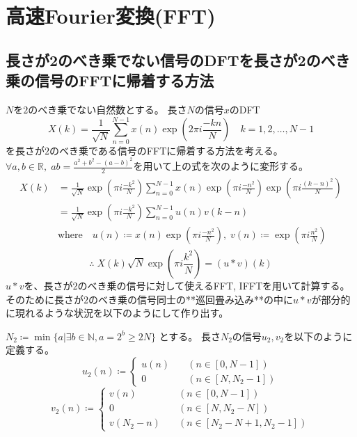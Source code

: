 \chapter{高速Fourier変換(FFT)}
    \section{長さが2のべき乗でない信号のDFTを長さが2のべき乗の信号のFFTに帰着する方法}
        $N$を$2$のべき乗でない自然数とする。
        長さ$N$の信号$x$のDFT
        \[ X(k) = \frac{1}{\sqrt{N}} \sum_{n=0}^{N-1} x(n)\exp \left(2\pi i\frac{-kn}{N}\right) \quad k=1,2,\dots,N-1 \]
        を長さが$2$のべき乗である信号のFFTに帰着する方法を考える。
        $\forall a,b\in\mathbb{R},\;ab = \frac{a^2 + b^2 - (a-b)^2}{2}$を用いて上の式を次のように変形する。
        \begin{align*}
            \begin{aligned}
                X(k) &= \frac{1}{\sqrt{N}} \exp \left(\pi i\frac{-k^2}{N}\right) \sum_{n=0}^{N-1} x(n)\exp \left(\pi i\frac{-n^2}{N}\right) \exp \left(\pi i\frac{(k-n)^2}{N}\right) \\
                &= \frac{1}{\sqrt{N}} \exp \left(\pi i\frac{-k^2}{N}\right) \sum_{n=0}^{N-1} u(n)v(k-n) \\
                & \text{where} \quad u(n) \coloneq x(n)\exp \left(\pi i\frac{-n^2}{N}\right),\;v(n) \coloneq \exp \left(\pi i\frac{n^2}{N}\right)
            \end{aligned}
        \end{align*}
        \[ \therefore\; X(k)\sqrt{N} \exp \left(\pi i\frac{k^2}{N}\right) = (u*v)(k) \]
        $u*v$を、長さが$2$のべき乗の信号に対して使えるFFT, IFFTを用いて計算する。
        そのために長さが$2$のべき乗の信号同士の**巡回畳み込み**の中に$u*v$が部分的に現れるような状況を以下のようにして作り出す。
        \par
        $N_2 \coloneq \min\{a|\exists b\in \mathbb{N}, a = 2^b \geq 2N\}$ とする。
        長さ$N_2$の信号$u_2,v_2$を以下のように定義する。
        \[
            u_2(n) \coloneq \left\{
                \begin{aligned}
                    u(n) &\quad (n \in [0,N-1]) \\
                    0 &\quad (n \in [N,N_2-1])
                \end{aligned}
            \right.
        \]
        \[
            v_2(n) \coloneq \left\{
                \begin{aligned}
                    v(n) &\quad (n \in [0,N-1]) \\
                    0 &\quad (n\in [N,N_2-N]) \\
                    v(N_2-n) &\quad (n \in [N_2-N+1,N_2-1])
                \end{aligned}
            \right.
        \]

